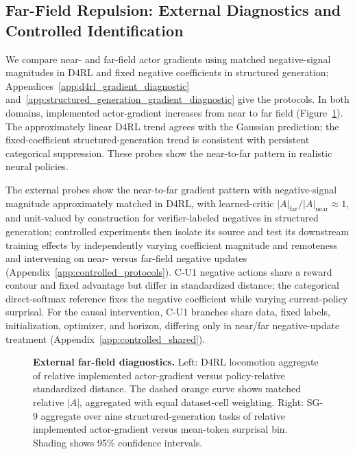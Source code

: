 \documentclass{article}
\providecommand{\Description}[1]{}
\theoremstyle{plain}
\theoremstyle{definition}
\theoremstyle{remark}
\begin{document}
\subsection{Far-Field Repulsion: External Diagnostics and Controlled Identification}
\label{sec:controlled_identification}

We compare near- and far-field actor gradients using matched negative-signal
magnitudes in D4RL and fixed negative coefficients in structured generation;
Appendices~\ref{app:d4rl_gradient_diagnostic}
and~\ref{app:structured_generation_gradient_diagnostic} give the protocols.
In both domains, implemented actor-gradient increases from near to far field
(Figure~\ref{fig:external_far_field}). The approximately linear D4RL
trend agrees with the Gaussian prediction; the fixed-coefficient
structured-generation trend is consistent with persistent categorical
suppression. These probes show the near-to-far pattern in realistic neural
policies.


The external probes show the near-to-far gradient pattern with negative-signal
magnitude approximately matched in D4RL, with learned-critic
\( |A|_{\mathrm{far}}/|A|_{\mathrm{near}} \approx 1 \), and unit-valued by
construction for verifier-labeled negatives in structured generation;
controlled experiments then isolate its source and test its downstream training effects by independently varying coefficient
magnitude and remoteness and intervening on near- versus far-field negative
updates (Appendix~\ref{app:controlled_protocols}). C-U1 negative actions share a reward contour and fixed advantage but differ in
standardized distance; the categorical direct-softmax reference fixes the
negative coefficient while varying current-policy surprisal. For the causal intervention, C-U1 branches share data, fixed labels,
initialization, optimizer, and horizon, differing only in near/far
negative-update treatment
(Appendix~\ref{app:controlled_shared}).

\begin{figure}[t]
    \centering
    \resizebox{0.49\columnwidth}{!}{%
    }
    \hfill
    \resizebox{0.49\columnwidth}{!}{%
    }

    \caption{
\textbf{External far-field diagnostics.}
Left: D4RL locomotion aggregate of relative implemented actor-gradient versus
policy-relative standardized distance. The dashed orange curve shows matched
relative \( |A| \), aggregated with equal dataset-cell weighting. Right: SG-9
aggregate over nine structured-generation tasks of relative implemented
actor-gradient versus mean-token surprisal bin. Shading shows 95\% confidence
intervals.
}
    \Description{Two-panel external diagnostic of relative implemented
actor-gradient versus learner-relative remoteness in D4RL and
structured-generation tasks.}
    \label{fig:external_far_field}
\end{figure}
\end{document}
